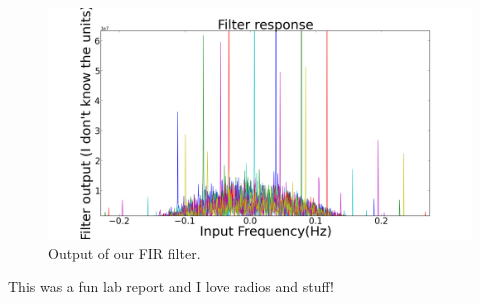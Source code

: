 \documentclass[11pt]{article}
\begin{document}
\begin{figure}
\centering
\includegraphics[scale=0.35]{pictures/fir}
\caption{Output of our FIR filter. \label{fir}}
\end{figure}




This was a fun lab report and I love radios and stuff! %

\end{document}
